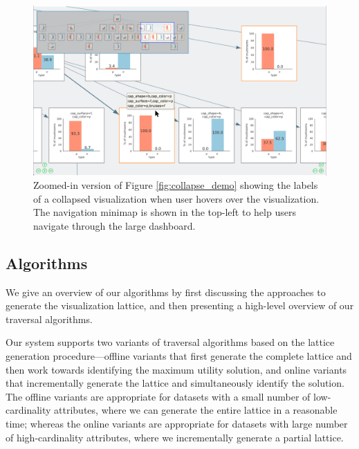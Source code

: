 \begin{figure}[ht!]
\centering
\includegraphics[width=\linewidth]{figures/minimap_zoom.png}
\caption{Zoomed-in version of Figure \ref{fig:collapse_demo} showing the labels of a collapsed visualization when user hovers over the visualization. The navigation minimap is shown in the top-left to help users navigate through the large dashboard.}
\label{fig:hover_minimap}
\end{figure}

\subsection{Algorithms\label{sec:algorithms}}
We give an overview of our algorithms by first discussing the approaches to generate the visualization lattice, and then presenting a high-level overview of our traversal algorithms.

 Our system supports two variants of traversal algorithms based on the lattice generation procedure---offline variants that first generate the complete lattice and then work towards identifying the maximum utility solution, and online variants that incrementally generate the lattice and simultaneously identify the solution. The offline variants are appropriate for datasets with a small number of low-cardinality attributes, where we can generate the entire lattice in a reasonable time; whereas the online variants are appropriate for datasets with large number of high-cardinality attributes, where we incrementally generate a partial lattice. 


